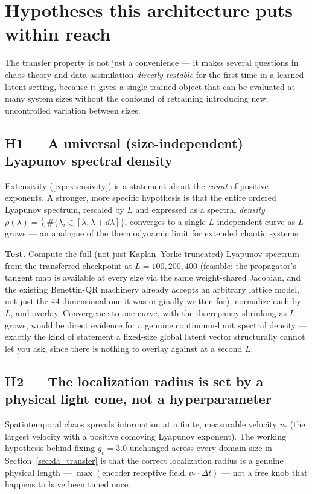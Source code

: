 \documentclass[11pt]{article}
\begin{document}
\section{Hypotheses this architecture puts within reach}
\label{sec:hypotheses}

The transfer property is not just a convenience --- it makes several
questions in chaos theory and data assimilation \emph{directly
testable} for the first time in a learned-latent setting, because it
gives a single trained object that can be evaluated at many system
sizes without the confound of retraining introducing new,
uncontrolled variation between sizes.

\subsection{H1 --- A universal (size-independent) Lyapunov spectral density}

Extensivity (\eqref{eq:extensivity}) is a statement about the
\emph{count} of positive exponents. A stronger, more specific
hypothesis is that the entire ordered Lyapunov spectrum, rescaled by
$L$ and expressed as a spectral \emph{density} $\rho(\lambda) =
\frac{1}{L}\,\#\{\lambda_i \in [\lambda,\lambda+d\lambda]\}$, converges
to a single $L$-independent curve as $L$ grows --- an analogue of the
thermodynamic limit for extended chaotic systems.

\textbf{Test.} Compute the full (not just Kaplan--Yorke-truncated)
Lyapunov spectrum from the transferred checkpoint at $L=100,200,400$
(feasible: the propagator's tangent map is available at every size via
the same weight-shared Jacobian, and the existing Benettin-QR machinery
already accepts an arbitrary lattice model, not just the $44$-dimensional
one it was originally written for), normalize each by $L$, and overlay.
Convergence to one curve, with the discrepancy shrinking as $L$ grows,
would be direct evidence for a genuine continuum-limit spectral density
--- exactly the kind of statement a fixed-size global latent vector
structurally cannot let you ask, since there is nothing to overlay
against at a second $L$.

\subsection{H2 --- The localization radius is set by a physical light cone, not a hyperparameter}

Spatiotemporal chaos spreads information at a finite, measurable
velocity $v_*$ (the largest velocity with a positive comoving Lyapunov
exponent). The working hypothesis behind fixing $g_c=3.0$ unchanged
across every domain size in Section~\ref{sec:da_transfer} is that the
correct localization radius is a genuine physical length ---
$\max(\text{encoder receptive field}, v_* \cdot \Delta t)$ --- not a
free knob that happens to have been tuned once.
\end{document}
